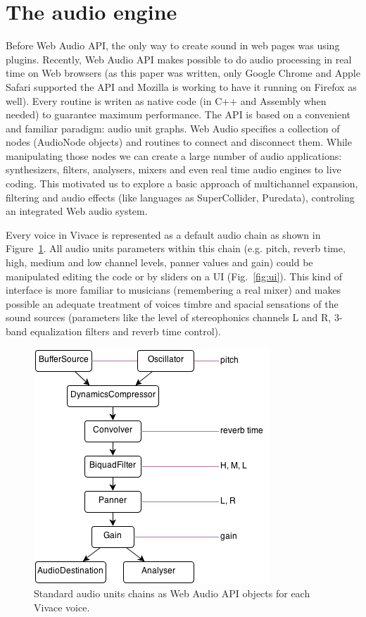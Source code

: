 \documentclass[letterpaper, 12pt]{article}
\begin{document}
\section{The audio engine}
\label{audioengine}

Before Web Audio API, the only way to create sound in web pages was
using plugins. Recently, Web Audio API makes possible to do audio
processing in real time on Web browsers (as this paper was written,
only Google Chrome and Apple Safari supported the API and Mozilla is
working to have it running on Firefox as well). Every routine is
writen as native code (in C++ and Assembly when needed) to guarantee
maximum performance. The API is based on a convenient and familiar
paradigm: audio unit graphs. Web Audio specifies a collection of nodes
(AudioNode objects) and routines to connect and disconnect them. While
manipulating those nodes we can create a large number of audio
applications: synthesizers, filters, analysers, mixers and even real
time audio engines to live coding. This motivated us to explore a
basic approach of multichannel expansion, filtering and audio effects
(like languages as SuperCollider, Puredata), controling an integrated
Web audio system.

Every voice in Vivace is represented as a default audio chain as shown
in Figure~\ref{fig:chain}. All audio units parameters within this
chain (e.g. pitch, reverb time, high, medium and low channel levels,
panner values and gain) could be manipulated editing the code or by
sliders on a UI (Fig.~\ref{fig:ui}). This kind of interface is more
familiar to musicians (remembering a real mixer) and makes possible an
adequate treatment of voices timbre and spacial sensations of the
sound sources (parameters like the level of stereophonics channels L
and R, 3-band equalization filters and reverb time control).

\begin{figure}[htpb]
  \begin{center}
    \includegraphics[scale=.5]{img/fig_chain.png}
    \caption{Standard audio units chains as Web Audio API objects for
      each Vivace voice.}
    \label{fig:chain}
  \end{center}
\end{figure}
\end{document}
